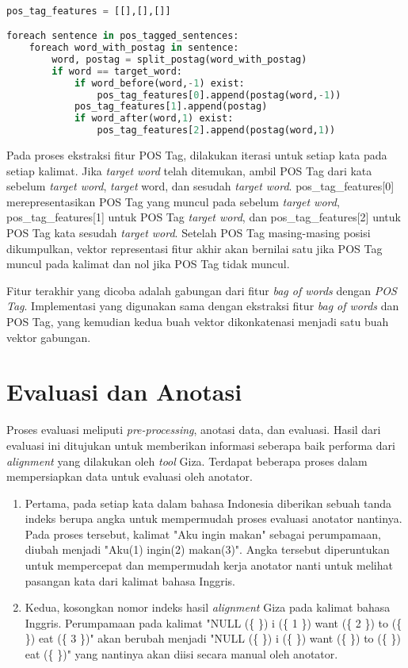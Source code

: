\begin{lstlisting}[language=python,caption={Ekstraksi Fitur POS Tag}, label={fitur-postag}]

pos_tag_features = [[],[],[]]

foreach sentence in pos_tagged_sentences:
	foreach word_with_postag in sentence:
		word, postag = split_postag(word_with_postag)
		if word == target_word:
			if word_before(word,-1) exist:
				pos_tag_features[0].append(postag(word,-1))
			pos_tag_features[1].append(postag)
			if word_after(word,1) exist:
				pos_tag_features[2].append(postag(word,1))

\end{lstlisting}

Pada proses ekstraksi fitur POS Tag, dilakukan iterasi untuk setiap kata pada setiap kalimat. Jika \textit{target word} telah ditemukan, ambil POS Tag dari kata sebelum \textit{target word}, \textit{target} word, dan sesudah \textit{target word}. pos\_tag\_features[0] merepresentasikan POS Tag yang muncul pada sebelum \textit{target word}, pos\_tag\_features[1] untuk POS Tag \textit{target word}, dan pos\_tag\_features[2] untuk POS Tag kata sesudah \textit{target word}. Setelah POS Tag masing-masing posisi dikumpulkan, vektor representasi fitur akhir akan bernilai satu jika POS Tag muncul pada kalimat dan nol jika POS Tag tidak muncul. 

Fitur terakhir yang dicoba adalah gabungan dari fitur \textit{bag of words} dengan \textit{POS Tag}. Implementasi yang digunakan sama dengan ekstraksi fitur \textit{bag of words} dan POS Tag, yang kemudian kedua buah vektor dikonkatenasi menjadi satu buah vektor gabungan.

\section{Evaluasi dan Anotasi}

Proses evaluasi meliputi \textit{pre-processing}, anotasi data, dan evaluasi. Hasil dari evaluasi ini ditujukan untuk memberikan informasi seberapa baik performa dari \textit{alignment} yang dilakukan oleh \textit{tool} Giza. Terdapat beberapa proses dalam mempersiapkan data untuk evaluasi oleh anotator.
\begin{enumerate}
	\item Pertama, pada setiap kata dalam bahasa Indonesia diberikan sebuah tanda indeks berupa angka untuk mempermudah proses evaluasi anotator nantinya. Pada proses tersebut, kalimat "Aku ingin makan" sebagai perumpamaan, diubah menjadi "Aku(1) ingin(2) makan(3)". Angka tersebut diperuntukan untuk mempercepat dan mempermudah kerja anotator nanti untuk melihat pasangan kata dari kalimat bahasa Inggris.
	\item Kedua, kosongkan nomor indeks hasil \textit{alignment} Giza pada kalimat bahasa Inggris. Perumpamaan pada kalimat "NULL (\{  \}) i (\{ 1 \}) want (\{ 2 \}) to (\{  \}) eat (\{ 3 \})" akan berubah menjadi  "NULL (\{  \}) i (\{  \}) want (\{   \}) to (\{  \}) eat (\{  \})" yang nantinya akan diisi secara manual oleh anotator.
\end{enumerate}

